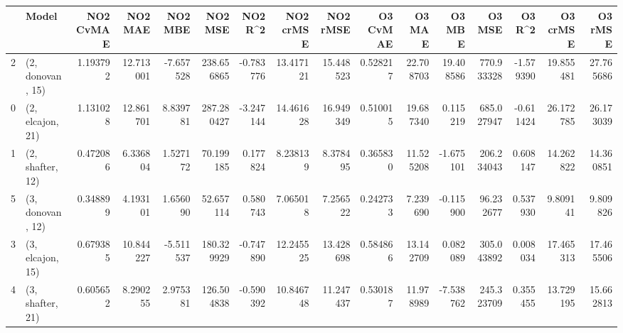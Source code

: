 \begin{tabular}{llrrrrrrrrrrrrrr}
\toprule
{} &             Model &  NO2 CvMAE &    NO2 MAE &   NO2 MBE &     NO2 MSE &   NO2 R\textasciicircum2 &  NO2 crMSE &   NO2 rMSE &  O3 CvMAE &     O3 MAE &     O3 MBE &      O3 MSE &    O3 R\textasciicircum2 &   O3 crMSE &    O3 rMSE \\
\midrule
2 &  (2, donovan, 15) &   1.193792 &  12.713001 & -7.657528 &  238.656865 & -0.783776 &  13.417121 &  15.448523 &  0.528217 &  22.708703 &  19.408586 &  770.933328 & -1.579390 &  19.855481 &  27.765686 \\
0 &  (2, elcajon, 21) &   1.131028 &  12.861701 &  8.839781 &  287.280427 & -3.247144 &  14.461628 &  16.949349 &  0.510015 &  19.687340 &   0.115219 &  685.027947 & -0.611424 &  26.172785 &  26.173039 \\
1 &  (2, shafter, 12) &   0.472086 &   6.336804 &  1.527172 &   70.199185 &  0.177824 &   8.238139 &   8.378495 &  0.365830 &  11.525208 &  -1.675101 &  206.234043 &  0.608147 &  14.262822 &  14.360851 \\
5 &  (3, donovan, 12) &   0.348899 &   4.193101 &  1.656090 &   52.657114 &  0.580743 &   7.065018 &   7.256522 &  0.242733 &   7.239690 &  -0.115900 &   96.232677 &  0.537930 &   9.809141 &   9.809826 \\
3 &  (3, elcajon, 15) &   0.679385 &  10.844227 & -5.511537 &  180.329929 & -0.747890 &  12.245525 &  13.428698 &  0.584866 &  13.142709 &   0.082089 &  305.043892 &  0.008034 &  17.465313 &  17.465506 \\
4 &  (3, shafter, 21) &   0.605652 &   8.290255 &  2.975381 &  126.504838 & -0.590392 &  10.846748 &  11.247437 &  0.530187 &  11.978989 &  -7.538762 &  245.323709 &  0.355455 &  13.729195 &  15.662813 \\
\bottomrule
\end{tabular}

